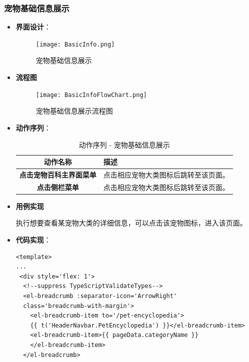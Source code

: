 \begin{itemize}
\end{itemize}

\subsubsection{宠物基础信息展示}

\begin{itemize}
	\item \textbf{界面设计}：
	\begin{figure}[H]
		\centering
		\texttt{[image: BasicInfo.png]}
		\caption{宠物基础信息展示}
		\label{宠物基础信息展示}
	\end{figure}
	
	\item \textbf{流程图}
	
	\begin{figure}[H]
		\centering
		\texttt{[image: BasicInfoFlowChart.png]}
		\caption{宠物基础信息展示流程图}
		\label{宠物基础信息展示流程图}
	\end{figure}
	
	\item \textbf{动作序列}：
	\begin{table}[H]
		\centering
		\caption{动作序列 - 宠物基础信息展示}
		\renewcommand\arraystretch{1.5}
		\begin{tabular}{|c|>{\raggedright\arraybackslash}p{10cm}|}
			\hline
			\textbf{动作名称} & \textbf{描述} \\ \hline
			\textbf{点击宠物百科主界面菜单} & 点击相应宠物大类图标后跳转至该页面。\\ \hline
			\textbf{点击侧栏菜单} & 点击相应宠物大类图标后跳转至该页面。\\ \hline
		\end{tabular}
	\end{table}
	
	\item \textbf{用例实现}
	
	执行想要查看某宠物大类的详细信息，可以点击该宠物图标，进入该页面。
	
	\item \textbf{代码实现}：
	\begin{verbatim}
<template>
...
 <div style='flex: 1'>
  <!--suppress TypeScriptValidateTypes-->
  <el-breadcrumb :separator-icon='ArrowRight' 
  class='breadcrumb-with-margin'>
    <el-breadcrumb-item to='/pet-encyclopedia'>
    {{ t('HeaderNavbar.PetEncyclopedia') }}</el-breadcrumb-item>
    <el-breadcrumb-item>{{ pageData.categoryName }}
    </el-breadcrumb-item>
  </el-breadcrumb>
	

\end{verbatim}
\end{itemize}
